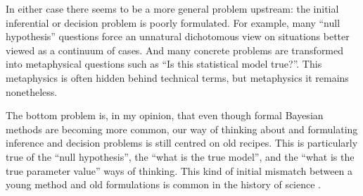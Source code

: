 \documentclass[\ifafour a4paper,12pt,\else a5paper,10pt,\fi%
onecolumn,oneside,article,%
british%
]{memoir}
\theoremstyle{remark}
\theoremstyle{innote}
\newcommand*{\citep}{\parencites}
\renewcommand*{\|}{\nonscript\,\vert\nonscript\;\mathopen{}}
\begin{document}
In either case there seems to be a more general problem upstream: the
initial inferential or decision problem is poorly formulated. For example,
many \enquote{null hypothesis} questions force an unnatural dichotomous
view on situations better viewed as a continuum of cases. And many concrete
problems are transformed into metaphysical questions such as \enquote{Is this
  statistical model true?}. This metaphysics is often hidden behind
technical terms, but metaphysics it remains nonetheless.

The bottom problem is, in my opinion, that even though formal Bayesian
methods are becoming more common, our way of thinking about and formulating
inference and decision problems is still centred on old recipes. This is
particularly true of the \enquote{null hypothesis}, the \enquote{what is
  the true model}, and the \enquote{what is the true parameter value} ways of
thinking. This kind of initial mismatch between a young method and old
formulations is common in the history of science
\citep{truesdell1968,kline1980_r1982,brush1976c_r1986,brush1976d_r1999,whittaker1910_r1951,whittaker1953}.
\end{document}
